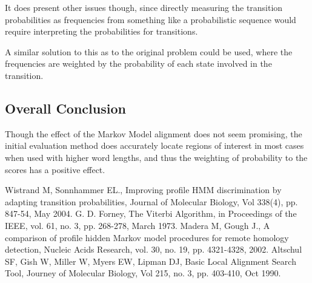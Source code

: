 \documentclass[12pt, conference]{IEEEtran}
\begin{document}
	It does present other issues though, since directly measuring the transition probabilities as frequencies from something like a probabilistic sequence would require interpreting the probabilities for transitions. 
	
	A similar solution to this as to the original problem could be used, where the frequencies are weighted by the probability of each state involved in the transition.
	
	\subsection{\textbf{Overall Conclusion}}
	
	Though the effect of the Markov Model alignment does not seem promising, the initial evaluation method does accurately locate regions of interest in most cases when used with higher word lengths, and thus the weighting of probability to the scores has a positive effect.

\begin{thebibliography}{00}
 Wistrand M, Sonnhammer EL., Improving profile HMM discrimination by adapting transition probabilities, Journal of Molecular Biology, Vol 338(4), pp. 847-54, May 2004.
 G. D. Forney, The Viterbi Algorithm, in Proceedings of the IEEE, vol. 61, no. 3, pp. 268-278, March 1973.
 Madera M, Gough J., A comparison of profile hidden Markov model procedures for remote homology detection, Nucleic Acids Research, vol. 30, no. 19, pp. 4321-4328, 2002.
 Altschul SF, Gish W, Miller W, Myers EW, Lipman DJ, Basic Local Alignment Search Tool, Journey of Molecular Biology, Vol 215, no. 3, pp. 403-410, Oct 1990.
\end{thebibliography}
\end{document}
